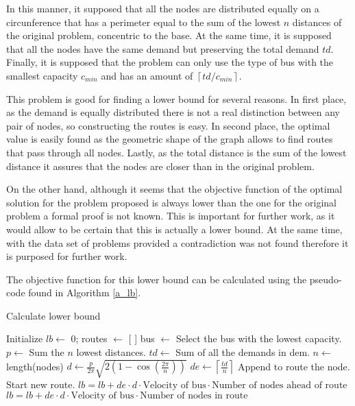 \documentclass[10pt,twoside]{article}
\begin{document}
In this manner, it supposed that all the nodes are distributed equally
on a circunference that has a perimeter equal to the sum of the lowest
$n$ distances of the original problem, concentric to the base. At the
same time, it is supposed that all the nodes have the same demand but
preserving the total demand $td$. Finally, it is supposed that the
problem can only use the type of bus with the smallest capacity
$c_{min}$ and has an amount of $\left \lceil{td/c_{min}} \right \rceil$.

This problem is good for finding a lower bound for several reasons. In
first place, as the demand is equally distributed there is not a real
distinction between any pair of nodes, so constructing the routes is
easy. In second place, the optimal value is easily found as the
geometric shape of the graph allows to find routes that pass through
all nodes. Lastly, as the total distance is the sum of the lowest
distance it assures that the nodes are closer than in the original
problem.

On the other hand, although it seems that the objective function of
the optimal solution for the problem proposed is always lower than the
one for the original problem a formal proof is not known. This is
important for further work, as it would allow to be certain that this
is actually a lower bound. At the same time, with the data set of
problems provided a contradiction was not found therefore it is
purposed for further work.

The objective function for this lower bound can be calculated using the pseudo-code found in Algorithm \ref{a_lb}.

\begin{algorithm}[H]
  \caption{Calculate lower bound} \label{a_lb}
  \begin{algorithmic}[1]
      \State Initialize $lb \gets$ 0; routes $\gets$ [ ]
      \State bus $\gets$ Select the bus with the lowest capacity.
      \State $p \gets$ Sum the $n$ lowest distances.
      \State $td \gets$ Sum of all the demands in dem.
      \State $n \gets$ length(nodes) 
      \State $d \gets \frac{p}{2\pi}\sqrt{2(1 - \cos{\left(\frac{2\pi}{n}\right)})}$
      \State $de \gets \left \lceil{\frac{td}{n}} \right \rceil$
          \State Append to route the node.
          \Else
          \State Start new route.
        \EndIf
      \EndFor
          \State $lb = lb + de \cdot d \cdot \text{Velocity of bus} \cdot \text{Number of nodes ahead of route}$
        \EndFor
        \State $lb = lb + de \cdot d \cdot \text{Velocity of bus} \cdot \text{Number of nodes in route}$  
      \EndFor
    \EndProcedure
  \end{algorithmic}
  
\end{algorithm}
\end{document}
